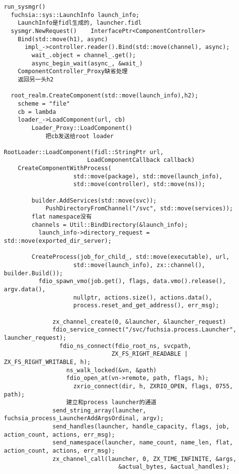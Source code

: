 \begin{verbatim}
run_sysmgr()
  fuchsia::sys::LaunchInfo launch_info;
    LaunchInfo是fidl生成的, launcher.fidl
  sysmgr.NewRequest()    InterfacePtr<ComponentController>
    Bind(std::move(h1), async)
      impl_->controller.reader().Bind(std::move(channel), async);
        wait_.object = channel_.get();
        async_begin_wait(async_, &wait_)
    ComponentController_Proxy缺省处理
    返回另一头h2

  root_realm.CreateComponent(std::move(launch_info),h2);
    scheme = "file"
    cb = lambda
    loader_->LoadComponent(url, cb)
        Loader_Proxy::LoadComponent()
            把cb发送给root loader

RootLoader::LoadComponent(fidl::StringPtr url,
                        LoadComponentCallback callback)
    CreateComponentWithProcess(
                    std::move(package), std::move(launch_info),
                    std::move(controller), std::move(ns));

        builder.AddServices(std::move(svc));
            PushDirectoryFromChannel("/svc", std::move(services));
        flat namespace没有
        channels = Util::BindDirectory(&launch_info);
          launch_info->directory_request = std::move(exported_dir_server);

        CreateProcess(job_for_child_, std::move(executable), url,
                    std::move(launch_info), zx::channel(), builder.Build());
          fdio_spawn_vmo(job.get(), flags, data.vmo().release(), argv.data(),
                    nullptr, actions.size(), actions.data(),
                    process.reset_and_get_address(), err_msg);

              zx_channel_create(0, &launcher, &launcher_request)  
              fdio_service_connect("/svc/fuchsia.process.Launcher", launcher_request);
                fdio_ns_connect(fdio_root_ns, svcpath,
                               ZX_FS_RIGHT_READABLE | ZX_FS_RIGHT_WRITABLE, h);
                  ns_walk_locked(&vn, &path)
                  fdio_open_at(vn->remote, path, flags, h); 
                    zxrio_connect(dir, h, ZXRIO_OPEN, flags, 0755, path);
                  建立和process launcher的通道
              send_string_array(launcher, fuchsia_process_LauncherAddArgsOrdinal, argv);
              send_handles(launcher, handle_capacity, flags, job, action_count, actions, err_msg);
              send_namespace(launcher, name_count, name_len, flat, action_count, actions, err_msg);
              zx_channel_call(launcher, 0, ZX_TIME_INFINITE, &args,
                                 &actual_bytes, &actual_handles);


\end{verbatim}

